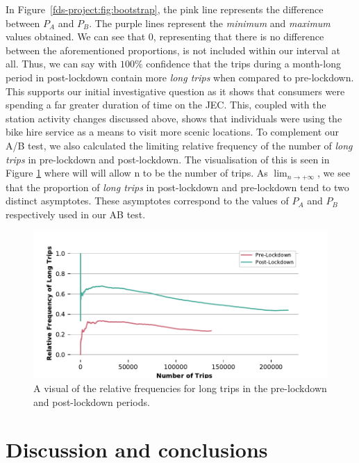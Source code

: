 \documentclass[11pt,a4paper]{article}
\begin{document}
In Figure~\ref{fds-project:fig:bootstrap}, the pink line represents the difference between $P_A$ and $P_B$. The purple lines represent the \emph{minimum} and \emph{maximum} values obtained. We can see that $0$, representing that there is no difference between the aforementioned proportions, is not included within our interval at all. Thus, we can say with $100\%$ confidence that the trips during a month-long period in post-lockdown contain more \emph{long trips} when compared to pre-lockdown. This supports our initial investigative question as it shows that consumers were spending a far greater duration of time on the JEC. This, coupled with the station activity changes discussed above, shows that individuals were using the bike hire service as a means to visit more scenic locations. To complement our A/B test, we also calculated the limiting relative frequency of the number of \emph{long trips} in pre-lockdown and post-lockdown. The visualisation of this is seen in Figure  \ref{fds-project:fig:relativeFrequency} where will  will allow n to be the number of trips. As $\lim_{n \to +\infty}$, we see that the proportion of \emph{long trips} in post-lockdown and pre-lockdown tend to two distinct asymptotes. These asymptotes correspond to the values of $P_A$ and $P_B$ respectively used in our AB test. 
\begin{figure}[ht]
  \includegraphics{relative_frequencies.pdf}
  \caption{A visual of the relative frequencies for long trips in the pre-lockdown and post-lockdown periods.}
  \label{fds-project:fig:relativeFrequency}
\end{figure}

\section{Discussion and conclusions}
\end{document}
